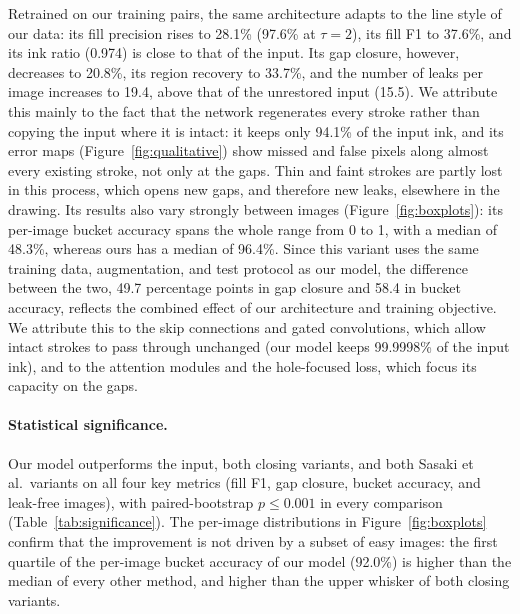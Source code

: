\documentclass[pdflatex,sn-mathphys-num]{sn-jnl}%
\begin{document}
Retrained on our training pairs, the same architecture adapts to the line style of
our data: its fill precision rises to 28.1\% (97.6\% at $\tau=2$), its fill F1 to
37.6\%, and its ink ratio (0.974) is close to that of the input. Its gap closure,
however, decreases to 20.8\%, its region recovery to 33.7\%, and the number of leaks
per image increases to 19.4, above that of the unrestored input (15.5). We attribute
this mainly to the fact that the network regenerates every stroke rather than copying
the input where it is intact: it keeps only 94.1\% of the input ink, and its error
maps (Figure~\ref{fig:qualitative}) show missed and false pixels along almost every
existing stroke, not only at the gaps. Thin and faint strokes are partly lost in this
process, which opens new gaps, and therefore new leaks, elsewhere in the drawing. Its
results also vary strongly between images (Figure~\ref{fig:boxplots}): its per-image
bucket accuracy spans the whole range from 0 to 1, with a median of 48.3\%, whereas
ours has a median of 96.4\%. Since this variant uses the same training data,
augmentation, and test protocol as our model, the difference between the two, 49.7
percentage points in gap closure and 58.4 in bucket accuracy, reflects the combined
effect of our architecture and training objective. We attribute this to the skip connections and gated convolutions, which allow intact strokes to pass through unchanged (our model keeps 99.9998\% of the input ink), and to the attention modules and the hole-focused loss, which focus its capacity on the gaps.

\paragraph{Statistical significance.} Our model outperforms the input, both closing
variants, and both Sasaki et al.\ variants on all four key metrics (fill F1, gap
closure, bucket accuracy, and leak-free images), with paired-bootstrap $p \le 0.001$ in
every comparison (Table~\ref{tab:significance}). The per-image distributions in
Figure~\ref{fig:boxplots} confirm that the improvement is not driven by a subset of
easy images: the first quartile of the per-image bucket accuracy of our model
(92.0\%) is higher than the median of every other method, and higher than the upper
whisker of both closing variants.
\end{document}
